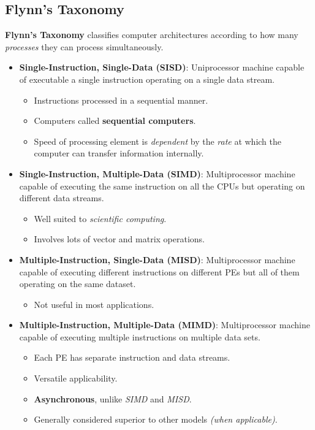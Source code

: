 \documentclass[12pt, letterpaper]{article}
\begin{document}
\subsection*{Flynn's Taxonomy}

\textbf{Flynn's Taxonomy} classifies computer architectures according to how many \textit{processes} they can process simultaneously.

\begin{itemize}
    \item \textbf{Single-Instruction, Single-Data (SISD)}: Uniprocessor machine capable of executable a single instruction operating on a single data stream.
        \begin{itemize}
            \item Instructions processed in a sequential manner.
            \item Computers called \textbf{sequential computers}.
            \item Speed of processing element is \textit{dependent} by the \textit{rate} at which the computer can transfer information internally.
        \end{itemize}
    \item \textbf{Single-Instruction, Multiple-Data (SIMD)}: Multiprocessor machine capable of executing the same instruction on all the CPUs but operating on different data streams.
        \begin{itemize}
            \item Well suited to \textit{scientific computing}.
            \item Involves lots of vector and matrix operations.
        \end{itemize}
    \item \textbf{Multiple-Instruction, Single-Data (MISD)}: Multiprocessor machine capable of executing different instructions on different PEs but all of them operating on the same dataset.
        \begin{itemize}
            \item Not useful in most applications.
        \end{itemize}
    \item \textbf{Multiple-Instruction, Multiple-Data (MIMD)}: Multiprocessor machine capable of executing multiple instructions on multiple data sets.
        \begin{itemize}
            \item Each PE has separate instruction and data streams.
            \item Versatile applicability.
            \item \textbf{Asynchronous}, unlike \textit{SIMD} and \textit{MISD}.
            \item Generally considered superior to other models \textit{(when applicable)}.
        \end{itemize}


\end{itemize}
\end{document}
